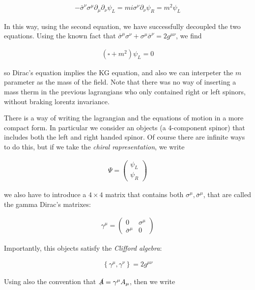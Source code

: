 \documentclass{report}
\begin{document}
\begin{align}
    -\bar{\sigma}^\nu\sigma^\mu \partial_\mu\partial_\nu \psi_L = mi\sigma^\nu\partial_\nu\psi_R = m^2\psi_L
\end{align}

In this way, using the second equation, we have successfully decoupled the two equations. Using the known fact that \(\bar{\sigma}^\mu\sigma^\nu + \sigma^\mu\bar{\sigma}^\nu = 2g^{\mu\nu}\), we find 

\begin{align}
    (\square + m^2)\psi_L = 0 
\end{align}

so Dirac's equation implies the KG equation, and also we can interpeter the \(m\) parameter as the mass of the field. Note that there was no way of inserting a mass therm in the previous lagrangians who only contained right or left spinors, without braking lorentz invariance. 


There is a way of writing the lagrangian and the equations of motion in a more compact form. In particular we consider an objects (a 4-component spinor) that includes both the left and right handed spinor. Of course there are infinite ways to do this, but if we take the \emph{chiral rapresentation}, we write

\begin{align}
    \Psi = \begin{pmatrix}
        \psi_L \\
        \psi_R
    \end{pmatrix}
\end{align}

we also have to introduce a \(4\times 4\) matrix that contains both \(\sigma^\mu, \bar{\sigma}^\mu\), that are called the gamma Dirac's matrixes: 

\begin{align}
    \gamma^\mu = \begin{pmatrix}
        0 & \sigma^\mu \\
        \bar{\sigma}^\mu & 0 
    \end{pmatrix}
\end{align}

Importantly, this objects satisfy the \emph{Clifford algebra}: 

\begin{align}
    \left\{\gamma^\mu, \gamma^\nu \right\} = 2g^{\mu\nu}
\end{align}

Using also the convention that \(\slashed{A} = \gamma^\mu A_\mu\), then we write 
\end{document}
